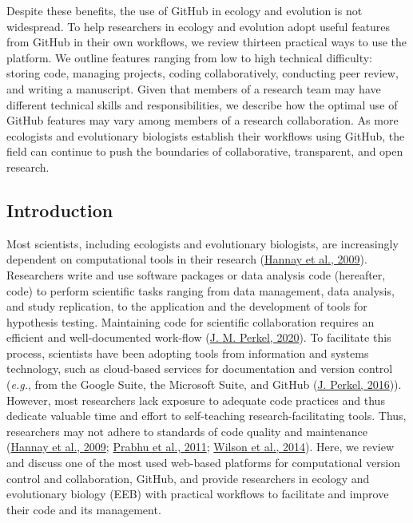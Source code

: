 Despite these benefits, the use of GitHub in ecology and evolution is not widespread.
To help researchers in ecology and evolution adopt useful features from GitHub in their own workflows, we review thirteen practical ways to use the platform.
We outline features ranging from low to high technical difficulty: storing code, managing projects, coding collaboratively, conducting peer review, and writing a manuscript.
Given that members of a research team may have different technical skills and responsibilities, we describe how the optimal use of GitHub features may vary among members of a research collaboration.
As more ecologists and evolutionary biologists establish their workflows using GitHub, the field can continue to push the boundaries of collaborative, transparent, and open research.

\hypertarget{introduction}{%
\subsection{Introduction}\label{introduction}}

Most scientists, including ecologists and evolutionary biologists, are increasingly dependent on computational tools in their research (\protect\hyperlink{ref-fJWFe93e}{Hannay et al., 2009}).
Researchers write and use software packages or data analysis code (hereafter, code) to perform scientific tasks ranging from data management, data analysis, and study replication, to the application and the development of tools for hypothesis testing.
Maintaining code for scientific collaboration requires an efficient and well-documented work-flow (\protect\hyperlink{ref-1Kqna6l2}{J. M. Perkel, 2020}).
To facilitate this process, scientists have been adopting tools from information and systems technology, such as cloud-based services for documentation and version control (\emph{e.g.}, from the Google Suite, the Microsoft Suite, and GitHub (\protect\hyperlink{ref-10ghgV3S8}{J. Perkel, 2016})).
However, most researchers lack exposure to adequate code practices and thus dedicate valuable time and effort to self-teaching research-facilitating tools.
Thus, researchers may not adhere to standards of code quality and maintenance (\protect\hyperlink{ref-fJWFe93e}{Hannay et al., 2009}; \protect\hyperlink{ref-10SpoByIw}{Prabhu et al., 2011}; \protect\hyperlink{ref-O6UbstGG}{Wilson et al., 2014}).
Here, we review and discuss one of the most used web-based platforms for computational version control and collaboration, GitHub, and provide researchers in ecology and evolutionary biology (EEB) with practical workflows to facilitate and improve their code and its management.

